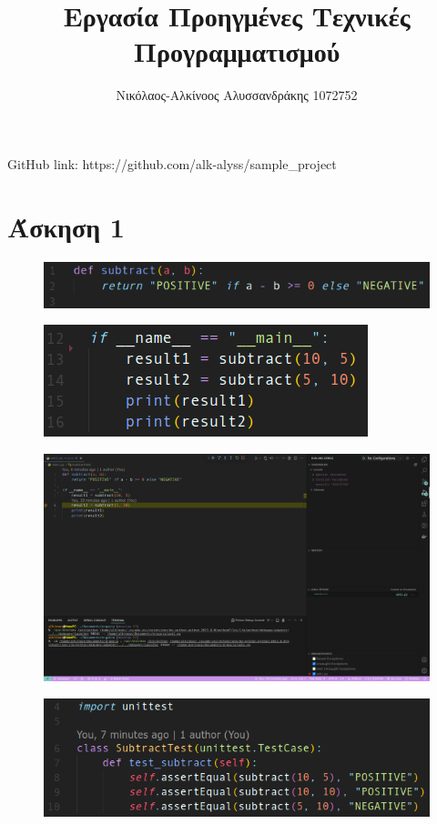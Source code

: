 \documentclass{article}
\title{Εργασία Προηγμένες Τεχνικές Προγραμματισμού}
\author{Νικόλαος-Αλκίνοος Αλυσσανδράκης 1072752}
\date{}
\begin{document}
\maketitle

GitHub link: https://github.com/alk-alyss/sample\_project

\section*{Άσκηση 1}
	\begin{figure}[H]
		\includegraphics[width=\textwidth]{"1.png"}
	\end{figure}
	\begin{figure}[H]
		\includegraphics[width=\textwidth]{"2.png"}
	\end{figure}
	\begin{figure}[H]
		\includegraphics[width=\textwidth]{"3.png"}
	\end{figure}
	\begin{figure}[H]
		\includegraphics[width=\textwidth]{"4.png"}
	\end{figure}
\end{document}
